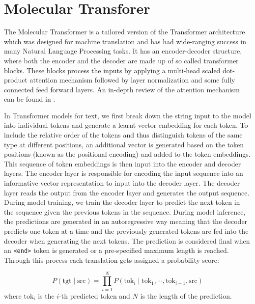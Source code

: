 \section{Molecular Transforer}
The Molecular Transformer \cite{Schwaller2019MolecularPrediction} is a tailored version of the Transformer architecture \cite{Vaswani2017} which was designed for machine translation and has had wide-ranging success in many Natural Language Processing tasks. It has an encoder-decoder structure, where both the encoder and the decoder are made up of so called transformer blocks. These blocks process the inputs by applying a multi-head scaled dot-product attention mechanism followed by layer normalization and some fully connected feed forward layers. An in-depth review of the attention mechanism can be found in \cite{Niu2021AttnReview}.

In Transformer models for text, we first break down the string input to the model into individual tokens and generate a learnt vector embedding for each token. To include the relative order of the tokens and thus distinguish tokens of the same type at different positions, an additional vector is generated based on the token positions (known as the positional encoding) and added to the token embeddings. This sequence of token embeddings is then input into the encoder and decoder layers. The encoder layer is responsible for encoding the input sequence into an informative vector representation to input into the decoder layer. The decoder layer reads the output from the encoder  layer and generates the output sequence. During model training, we train the decoder layer to predict the next token in the sequence given the previous tokens in the sequence. During model inference, the predictions are generated in an autoregressive way meaning that the decoder predicts one token at a time and the previously generated tokens are fed into the decoder when generating the next tokens. The prediction is considered final when an \texttt{<end>} token is generated or a pre-specified maximum length is reached. Through this process each translation gets assigned a probability score:

\begin{equation}
    P(\textrm{tgt} \mid \textrm{src}) = \prod_{i=1}^N P(\textrm{tok}_i \mid \textrm{tok}_1, \cdots , \textrm{tok}_{i-1}, \textrm{src}) 
\end{equation}
where $\textrm{tok}_i$ is the $i$-th predicted token and $N$ is the length of the prediction.

